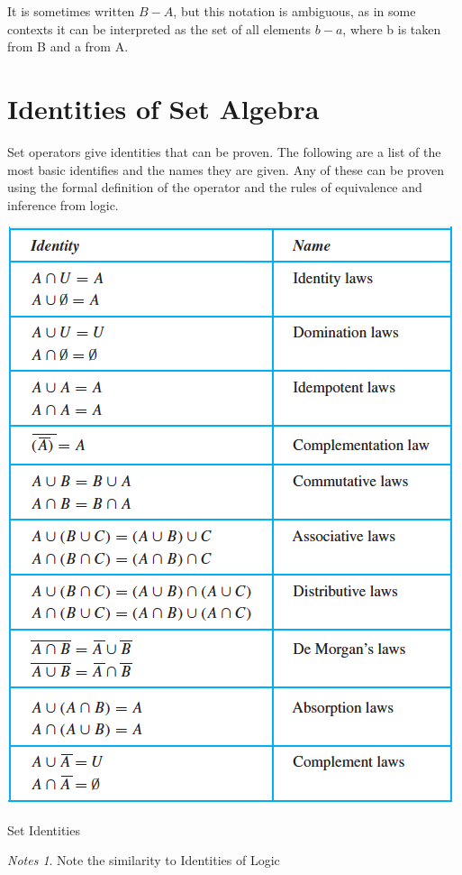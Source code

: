 \documentclass[11pt]{book} %
\theoremstyle {definition}
\theoremstyle {remark}
\newtheorem*{notes}{Notes}
\begin{document}
 It is sometimes written $B - A$, but this notation is ambiguous, as in some contexts it can be interpreted as the set of all elements $b - a$, where b is taken from B and a from A.


\section {Identities of Set Algebra}
Set operators give identities that can be proven. The following are a list of the most basic identifies and the names they are given. Any of these can be proven using the formal definition of the operator and the rules of equivalence and inference from logic.


   \begin{table}[htbp]
   \centering
  
   \includegraphics [scale=0.5]{Table-2-2-1-SetIdentities}
   \caption{Set Identities}
   \label{table:Set Identities}
\end{table}


\begin{notes}
Note the similarity to Identities of Logic 
\end{notes}
\end{document}
